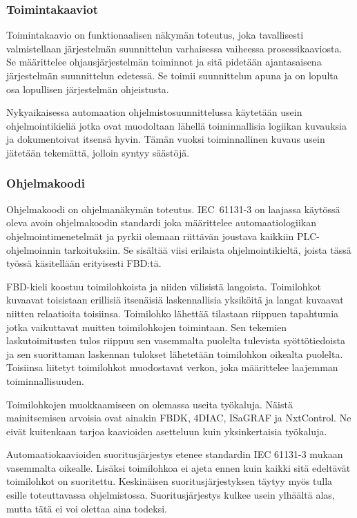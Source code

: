 \documentclass[finnish,12pt]{article}
\begin{document}
		\subsubsection{Toimintakaaviot}

Toimintakaavio on funktionaalisen näkymän toteutus, joka tavallisesti valmistellaan järjestelmän suunnittelun varhaisessa vaiheessa prosessikaaviosta.
Se määrittelee ohjausjärjestelmän toiminnot ja sitä pidetään ajantasaisena järjestelmän suunnittelun edetessä.
Se toimii suunnittelun apuna ja on lopulta osa lopullisen järjestelmän ohjeistusta.

Nykyaikaisessa automaation ohjelmistosuunnittelussa käytetään usein ohjelmointikieliä jotka ovat muodoltaan lähellä toiminnallisia logiikan kuvauksia ja dokumentoivat itsensä hyvin.
Tämän vuoksi toiminnallinen kuvaus usein jätetään tekemättä, jolloin syntyy säästöjä. \cite{RefWorks:41}

		\subsubsection{Ohjelmakoodi}

Ohjelmakoodi on ohjelmanäkymän toteutus.
IEC~61131-3 on laajassa käytössä oleva avoin ohjelmakoodin standardi joka määrittelee automaatiologiikan ohjelmointimenetelmät ja pyrkii olemaan riittävän joustava kaikkiin PLC-ohjelmoinnin tarkoituksiin.
Se sisältää viisi erilaista ohjelmointikieltä, joista tässä työssä käsitellään erityisesti FBD:tä. \cite{RefWorks:62}

FBD-kieli koostuu toimilohkoista ja niiden välisistä langoista.
Toimilohkot kuvaavat toisistaan erillisiä itsenäisiä laskennallisia yksiköitä ja langat kuvaavat niitten relaatioita toisiinsa.
Toimilohko lähettää tilastaan riippuen tapahtumia jotka vaikuttavat muitten toimilohkojen toimintaan.
Sen tekemien laskutoimitusten tulos riippuu sen vasemmalta puolelta tulevista syöttötiedoista ja sen suorittaman laskennan tulokset lähetetään toimilohkon oikealta puolelta.
Toisiinsa liitetyt toimilohkot muodostavat verkon, joka määrittelee laajemman toiminnallisuuden. \cite{RefWorks:55}

Toimilohkojen muokkaamiseen on olemassa useita työkaluja.
Näistä mainitsemisen arvoisia ovat ainakin FBDK, 4DIAC, ISaGRAF ja NxtControl.
Ne eivät kuitenkaan tarjoa kaavioiden asetteluun kuin yksinkertaisia työkaluja. \cite{RefWorks:35}

Automaatiokaavioiden suoritusjärjestys etenee standardin IEC 61131-3 mukaan vasemmalta oikealle.
Lisäksi toimilohkoa ei ajeta ennen kuin kaikki sitä edeltävät toimilohkot on suoritettu.
Keskinäisen suoritusjärjestyksen täytyy myös tulla esille toteuttavassa ohjelmistossa.
Suoritusjärjestys kulkee usein ylhäältä alas, mutta tätä ei voi olettaa aina todeksi. \cite{RefWorks:62}
\end{document}
